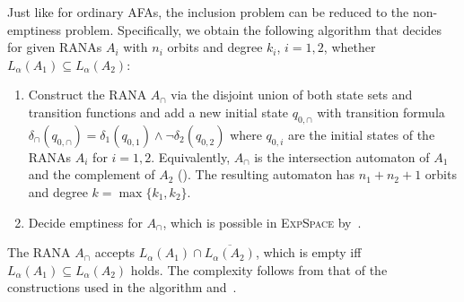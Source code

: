 \documentclass[10pt,a4paper]{amsart}
\theoremstyle{definition}
\newcommand{\seq}{\subseteq}
\newcommand{\set}[1]{\{#1\}}
\newcommand{\EXPSPACE}{\textsc{ExpSpace}\xspace}
\begin{document}
\begin{IEEEproof}

Just like for ordinary AFAs, the inclusion problem can be reduced to the non-emptiness problem. Specifically, we obtain the following algorithm that decides for given RANAs $A_i$ with $n_i$ orbits and degree $k_i$, $i = 1,2$, whether {$L_\alpha(A_1) \seq L_\alpha(A_2)$}:
  \begin{enumerate}
    \item Construct the RANA $A_{\cap}$ via the disjoint union of both state sets and
      transition functions and add a new initial state $q_{0,\cap}$ with transition formula
      $\delta_{\cap}(q_{0,\cap}) = \delta_1(q_{0,1}) \wedge \neg\delta_2(q_{0,2})$ where
      $q_{0,i}$ are the initial states of the RANAs $A_i$ for $i = 1,2$. Equivalently, $A_{\cap}$ is the intersection automaton of $A_1$ and the complement of $A_2$ ().
      The resulting automaton has $n_1 + n_2 + 1$ orbits and degree $k = \max\set{k_1,k_2}$.
    \item Decide emptiness for $A_{\cap}$, which is possible in
      \EXPSPACE by~.
  \end{enumerate}

The RANA $A_\cap$ accepts $L_{\alpha}(A_1) \cap \overline{L_{\alpha}(A_2)}$, which is empty iff $L_{\alpha}(A_1) \seq L_{\alpha}(A_2)$ holds. The complexity follows from that of the constructions used in the algorithm and~.
\end{IEEEproof}

\endgroup
\end{document}
